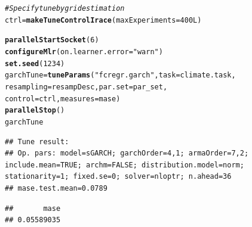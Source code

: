 \documentclass{article}\usepackage[]{graphicx}\usepackage[]{color}
\makeatletter
\newcommand{\hlnum}[1]{\textcolor[rgb]{0.686,0.059,0.569}{#1}}%
\newcommand{\hlstr}[1]{\textcolor[rgb]{0.192,0.494,0.8}{#1}}%
\newcommand{\hlcom}[1]{\textcolor[rgb]{0.678,0.584,0.686}{\textit{#1}}}%
\newcommand{\hlstd}[1]{\textcolor[rgb]{0.345,0.345,0.345}{#1}}%
\newcommand{\hlkwb}[1]{\textcolor[rgb]{0.69,0.353,0.396}{#1}}%
\newcommand{\hlkwc}[1]{\textcolor[rgb]{0.333,0.667,0.333}{#1}}%
\newcommand{\hlkwd}[1]{\textcolor[rgb]{0.737,0.353,0.396}{\textbf{#1}}}%
\newenvironment{kframe}{%
 \def\at@end@of@kframe{}%
 \ifinner\ifhmode%
  \def\at@end@of@kframe{\end{minipage}}%
  \begin{minipage}{\columnwidth}%
 \fi\fi%
 \def\FrameCommand##1{\hskip\@totalleftmargin \hskip-\fboxsep
 \colorbox{shadecolor}{##1}\hskip-\fboxsep
     \hskip-\linewidth \hskip-\@totalleftmargin \hskip\columnwidth}%
 \MakeFramed {\advance\hsize-\width
   \@totalleftmargin\z@ \linewidth\hsize
   \@setminipage}}%
 {\par\unskip\endMakeFramed%
 \at@end@of@kframe}
\newenvironment{knitrout}{}{} %
\theoremstyle{definition}
\makeatother
\begin{document}
\begin{knitrout}
\begin{kframe}
\begin{alltt}
\hlcom{#Specify tune by grid estimation}
\hlstd{ctrl} \hlkwb{=} \hlkwd{makeTuneControlIrace}\hlstd{(}\hlkwc{maxExperiments} \hlstd{=} \hlnum{400L}\hlstd{)}

\hlkwd{parallelStartSocket}\hlstd{(}\hlnum{6}\hlstd{)}
\hlkwd{configureMlr}\hlstd{(}\hlkwc{on.learner.error} \hlstd{=} \hlstr{"warn"}\hlstd{)}
\hlkwd{set.seed}\hlstd{(}\hlnum{1234}\hlstd{)}
\hlstd{garchTune} \hlkwb{=} \hlkwd{tuneParams}\hlstd{(}\hlstr{"fcregr.garch"}\hlstd{,} \hlkwc{task} \hlstd{= climate.task,}
                       \hlkwc{resampling} \hlstd{= resampDesc,} \hlkwc{par.set} \hlstd{= par_set,}
                       \hlkwc{control} \hlstd{= ctrl,} \hlkwc{measures} \hlstd{= mase)}
\hlkwd{parallelStop}\hlstd{()}
\hlstd{garchTune}
\end{alltt}
\end{kframe}
\end{knitrout}

\begin{knitrout}
\color{fgcolor}\begin{kframe}
\begin{verbatim}
## Tune result:
## Op. pars: model=sGARCH; garchOrder=4,1; armaOrder=7,2; include.mean=TRUE; archm=FALSE; distribution.model=norm; stationarity=1; fixed.se=0; solver=nloptr; n.ahead=36
## mase.test.mean=0.0789
\end{verbatim}
\end{kframe}
\end{knitrout}

\begin{knitrout}
\color{fgcolor}\begin{kframe}
\begin{verbatim}
##       mase 
## 0.05589035
\end{verbatim}
\end{kframe}
\end{knitrout}
\end{document}

